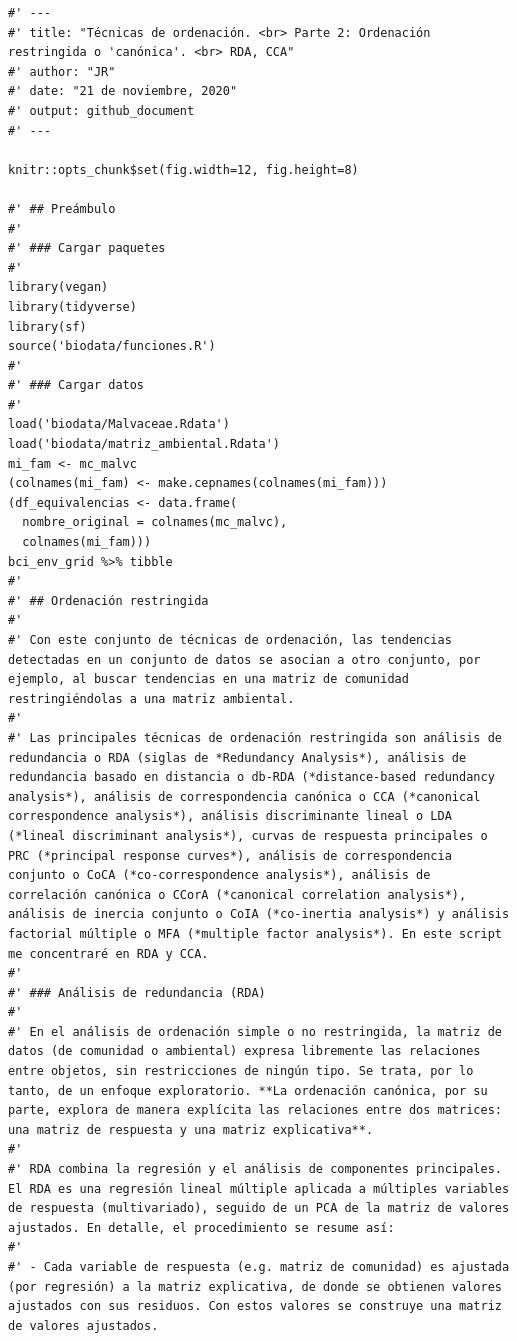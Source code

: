 \documentclass[11pt,]{article}
\begin{document}
\begin{verbatim}
#' ---
#' title: "Técnicas de ordenación. <br> Parte 2: Ordenación restringida o 'canónica'. <br> RDA, CCA"
#' author: "JR"
#' date: "21 de noviembre, 2020"
#' output: github_document
#' ---

knitr::opts_chunk$set(fig.width=12, fig.height=8)

#' ## Preámbulo
#' 
#' ### Cargar paquetes
#' 
library(vegan)
library(tidyverse)
library(sf)
source('biodata/funciones.R')
#' 
#' ### Cargar datos
#' 
load('biodata/Malvaceae.Rdata')
load('biodata/matriz_ambiental.Rdata')
mi_fam <- mc_malvc
(colnames(mi_fam) <- make.cepnames(colnames(mi_fam)))
(df_equivalencias <- data.frame(
  nombre_original = colnames(mc_malvc),
  colnames(mi_fam)))
bci_env_grid %>% tibble
#' 
#' ## Ordenación restringida
#' 
#' Con este conjunto de técnicas de ordenación, las tendencias detectadas en un conjunto de datos se asocian a otro conjunto, por ejemplo, al buscar tendencias en una matriz de comunidad  restringiéndolas a una matriz ambiental.
#' 
#' Las principales técnicas de ordenación restringida son análisis de redundancia o RDA (siglas de *Redundancy Analysis*), análisis de redundancia basado en distancia o db-RDA (*distance-based redundancy analysis*), análisis de correspondencia canónica o CCA (*canonical correspondence analysis*), análisis discriminante lineal o LDA (*lineal discriminant analysis*), curvas de respuesta principales o PRC (*principal response curves*), análisis de correspondencia conjunto o CoCA (*co-correspondence analysis*), análisis de correlación canónica o CCorA (*canonical correlation analysis*), análisis de inercia conjunto o CoIA (*co-inertia analysis*) y análisis factorial múltiple o MFA (*multiple factor analysis*). En este script me concentraré en RDA y CCA.
#' 
#' ### Análisis de redundancia (RDA)
#' 
#' En el análisis de ordenación simple o no restringida, la matriz de datos (de comunidad o ambiental) expresa libremente las relaciones entre objetos, sin restricciones de ningún tipo. Se trata, por lo tanto, de un enfoque exploratorio. **La ordenación canónica, por su parte, explora de manera explícita las relaciones entre dos matrices: una matriz de respuesta y una matriz explicativa**.
#' 
#' RDA combina la regresión y el análisis de componentes principales. El RDA es una regresión lineal múltiple aplicada a múltiples variables de respuesta (multivariado), seguido de un PCA de la matriz de valores ajustados. En detalle, el procedimiento se resume así:
#' 
#' - Cada variable de respuesta (e.g. matriz de comunidad) es ajustada (por regresión) a la matriz explicativa, de donde se obtienen valores ajustados con sus residuos. Con estos valores se construye una matriz de valores ajustados.

\end{verbatim}
\end{document}
